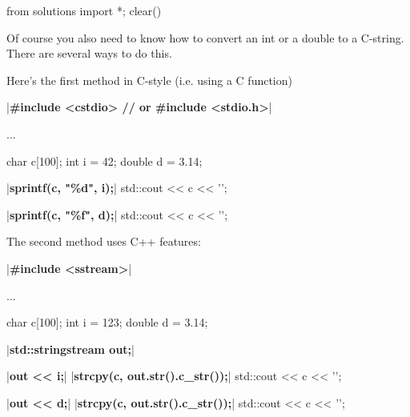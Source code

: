 \begin{python0}
from solutions import *; clear()
\end{python0}

Of course you also need to know how to convert an int or a double to a C-string. There are several ways to do this.

Here's the first method in C-style (i.e. using a C function)

\begin{consolethree}[escapeinside=||]
|\textbf{\#include <cstdio> // or \#include <stdio.h>}|

...

char c[100];
int i = 42;
double d = 3.14;

|\textbf{sprintf(c, "\%d", i);}|
std::cout << c << '\n';

|\textbf{sprintf(c, "\%f", d);}|
std::cout << c << '\n';
\end{consolethree}

The second method uses C++ features:

\begin{consolethree}[escapeinside=||]
|\textbf{\#include <sstream>}|

...

char c[100];
int i = 123;
double d = 3.14;

|\textbf{std::stringstream out;}|

|\textbf{out << i;}|
|\textbf{strcpy(c, out.str().c\_str());}|
std::cout << c << '\n';

|\textbf{out << d;}|
|\textbf{strcpy(c, out.str().c\_str());}|
std::cout << c << '\n';
\end{consolethree}

